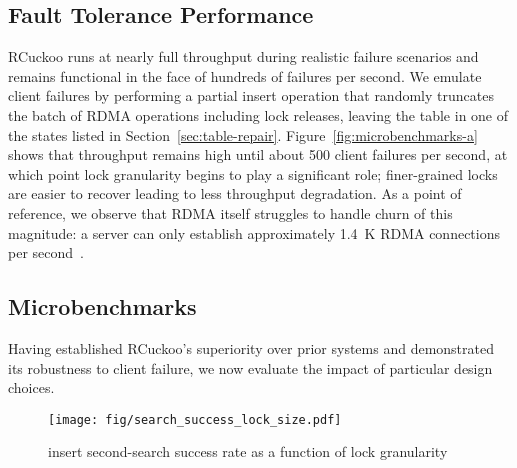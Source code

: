 \subsection{Fault Tolerance Performance}



RCuckoo runs at nearly full throughput during realistic
failure scenarios and remains functional in the face of
hundreds of failures per second.
We emulate client failures by
performing a partial insert operation that randomly truncates the
batch of RDMA operations including lock releases, leaving the table
in one of the  states listed in
Section~\ref{sec:table-repair}.
Figure~\ref{fig:microbenchmarks-a} shows that
throughput remains high until about 500 client failures per second, at
which point lock granularity begins to play a significant role;
finer-grained locks are easier to recover leading to less throughput
degradation.
As a point of reference, we observe that RDMA itself struggles to handle churn of this magnitude:
a server can only
establish approximately 1.4~K RDMA connections per second~\cite{xrdma}.

\subsection{Microbenchmarks}
\label{ss:mb}

Having established RCuckoo's superiority over prior systems and
demonstrated its robustness to client failure, we now evaluate the
impact of particular design choices.


\begin{figure}
\centering
        \texttt{[image: fig/search\_success\_lock\_size.pdf]}
\caption{insert second-search success rate as a function of lock granularity}
             \label{fig:microbenchmarks-c}
\end{figure}




